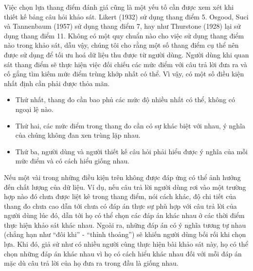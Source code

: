 Việc chọn lựa thang điểm đánh giá cũng là một yếu tố cần được xem xét khi thiết kế bảng câu hỏi khảo sát. Likert (1932) sử dụng thang điểm 5. Osgood, Suci và Tannenbaum (1957) sử dụng thang điểm 7, hay như Thurstone (1928) lại sử dụng thang điểm 11. Không có một quy chuẩn nào cho việc sử dụng thang điểm nào trong khảo sát, dẫu vậy, chúng tôi cho rằng một số thang điểm cụ thể nên được sử dụng để tối ưu hoá dữ liệu thu được từ người dùng. 
Người dùng khi quan sát thang điểm sẽ thực hiện việc đối chiếu các mức điểm với câu trả lời đưa ra và cố gắng tìm kiếm mức điểm trùng khớp nhất có thể. Vì vậy, có một số điều kiện nhất định cần phải được thỏa mãn. 
\begin{itemize}
    \item Thứ nhất, thang đo cần bao phủ các mức độ nhiều nhất có thể, không có ngoại lệ nào.
    \item Thứ hai, các mức điểm trong thang đo cần có sự khác biệt với nhau, ý nghĩa của chúng không đan xen trùng lặp nhau.
    \item Thứ ba, người dùng và người thiết kế câu hỏi phải hiểu được ý nghĩa của mỗi mức điểm và có cách hiểu giống nhau.
\end{itemize}
\par
Nếu một vài trong những điều kiện trên không được đáp ứng có thể ảnh hưởng đến chất lượng của dữ liệu. Ví dụ, nếu câu trả lời người dùng rơi vào một trường hợp nào đó chưa được liệt kê trong thang điểm, nói cách khác, độ chi tiết của thang đo chưa cao dẫn tới chưa có đáp án thực sự phù hợp với câu trả lời của người dùng lúc đó, dẫn tới họ có thể chọn các đáp án khác nhau ở các thời điểm thực hiện khảo sát khác nhau. Ngoài ra, những đáp án có ý nghĩa tương tự nhau (chẳng hạn như “đôi khi” - “thỉnh thoảng”) sẽ khiến người dùng bối rối khi chọn lựa. Khi đó, giả sử như có nhiều người cùng thực hiện bài khảo sát này, họ có thể chọn những đáp án khác nhau vì họ có cách hiểu khác nhau đối với mỗi đáp án mặc dù câu trả lời của họ đưa ra trong đầu là giống nhau.

